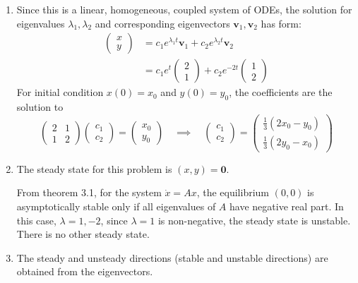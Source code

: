 \documentclass{/home/janmebows/Documents/LatexTemplates/myassignment}
\begin{document}
\begin{enumerate}
\begin{enumerate}
		
		\item %
		Since this is a linear, homogeneous, coupled system of ODEs, the solution for eigenvalues $\lambda_1,\lambda_2$ and corresponding eigenvectors $\mathbf{v}_1,\mathbf{v}_2$ has form:
		\begin{align*}
			\begin{pmatrix}
			x\\y
		\end{pmatrix} &= c_1 e^{\lambda_1 t} \mathbf{v}_1 + c_2 e^{\lambda_2 t} \mathbf{v}_2\\
		&= c_1 e^{t} \begin{pmatrix}2\\1\end{pmatrix} + c_2 e^{-2t} \begin{pmatrix}1\\2\end{pmatrix}
		\end{align*}
		For initial condition $x(0) = x_0$ and $y(0) = y_0$, the coefficients are the solution to
		\[\begin{pmatrix}2&1\\1&2\end{pmatrix} 
		\begin{pmatrix}c_1\\c_2\end{pmatrix} 
		= 
		\begin{pmatrix}x_0\\y_0\end{pmatrix} 
		\quad \implies \quad 
		\begin{pmatrix}c_1\\c_2\end{pmatrix}  
		=
		\begin{pmatrix} \frac{1}{3}(2x_0 - y_0)\\\frac{1}{3}(2y_0 - x_0)\end{pmatrix}\]
		\item %
		The steady state for this problem is $(x,y) = \mathbf{0}$.

		From theorem 3.1, for the system $\dot x = Ax$, the equilibrium $(0,0)$ is asymptotically stable only if all eigenvalues of $A$ have negative real part. In this case, $\lambda = 1,-2$, since $\lambda = 1$ is non-negative, the steady state is unstable. 
		There is no other steady state.

		
		\item %
		The steady and unsteady directions (stable and unstable directions) are obtained from the eigenvectors.


\end{enumerate}
\end{enumerate}
\end{document}
